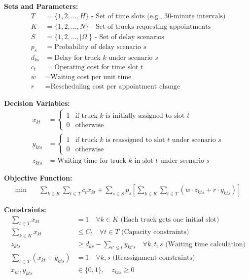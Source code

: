 \documentclass{article}
\begin{document}
\textbf{Sets and Parameters:}
\begin{align}
T &= \{1, 2, \ldots, H\} \text{ - Set of time slots (e.g., 30-minute intervals)} \\
K &= \{1, 2, \ldots, N\} \text{ - Set of trucks requesting appointments} \\
S &= \{1, 2, \ldots, |\Omega|\} \text{ - Set of delay scenarios} \\
p_s &= \text{Probability of delay scenario } s \\
d_{ks} &= \text{Delay for truck } k \text{ under scenario } s \\
c_t &= \text{Operating cost for time slot } t \\
w &= \text{Waiting cost per unit time} \\
r &= \text{Rescheduling cost per appointment change}
\end{align}

\textbf{Decision Variables:}
\begin{align}
x_{kt} &= \begin{cases} 
1 & \text{if truck } k \text{ is initially assigned to slot } t \\
0 & \text{otherwise}
\end{cases} \\
y_{kts} &= \begin{cases}
1 & \text{if truck } k \text{ is reassigned to slot } t \text{ under scenario } s \\
0 & \text{otherwise}
\end{cases} \\
z_{kts} &= \text{Waiting time for truck } k \text{ in slot } t \text{ under scenario } s
\end{align}

\textbf{Objective Function:}
\begin{align}
\min \quad & \sum_{k \in K} \sum_{t \in T} c_t x_{kt} + \sum_{s \in S} p_s \left[ \sum_{k \in K} \sum_{t \in T} (w \cdot z_{kts} + r \cdot y_{kts}) \right]
\end{align}

\textbf{Constraints:}
\begin{align}
\sum_{t \in T} x_{kt} &= 1 \quad \forall k \in K \text{ (Each truck gets one initial slot)} \\
\sum_{k \in K} x_{kt} &\leq C_t \quad \forall t \in T \text{ (Capacity constraints)} \\
z_{kts} &\geq d_{ks} - \sum_{t' \leq t} y_{kt's} \quad \forall k, t, s \text{ (Waiting time calculation)} \\
\sum_{t \in T} (x_{kt} + y_{kts}) &= 1 \quad \forall k, s \text{ (Reassignment constraints)} \\
x_{kt}, y_{kts} &\in \{0,1\}, \quad z_{kts} \geq 0
\end{align}
\end{document}
